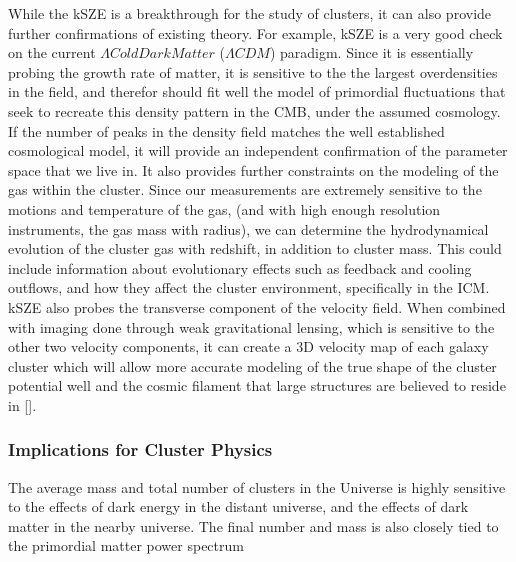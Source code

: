 \documentclass[manuscript]{aastex}
\begin{document}
While the kSZE is a breakthrough for the study of clusters, it can also provide further confirmations of existing theory. For example, kSZE is a very good check on the current \(\Lambda Cold Dark Matter\) (\(\Lambda CDM\)) paradigm. Since it is essentially probing the growth rate of matter, it is sensitive to the the largest overdensities in the field, and therefor should fit well the model of primordial fluctuations that seek to recreate this density pattern in the CMB, under the assumed cosmology. If the number of peaks in the density field matches the well established cosmological model, it will provide an independent confirmation of the parameter space that we live in. It also provides further constraints on the modeling of the gas within the cluster. Since our measurements are extremely sensitive to the motions and temperature of the gas, (and with high enough resolution instruments, the gas mass with radius), we can determine the hydrodynamical evolution of the cluster gas with redshift, in addition to cluster mass. This could include information about evolutionary effects such as feedback and cooling outflows, and how they affect the cluster environment, specifically in the ICM. kSZE also probes the transverse component of the velocity field. When combined with imaging done through weak gravitational lensing, which is sensitive to the other two velocity components, it can create a 3D velocity map of each galaxy cluster which will allow more accurate modeling of the true shape of the cluster potential well and the cosmic filament that large structures are believed to reside in [\cite{Birkinshaw1999}].

\subsubsection{Implications for Cluster Physics}

	The average mass and total number of clusters in the Universe is highly sensitive to the effects of dark energy in the distant universe, and the effects of dark matter in the nearby universe. The final number and mass is also closely tied to the primordial matter power spectrum 

\end{document}
